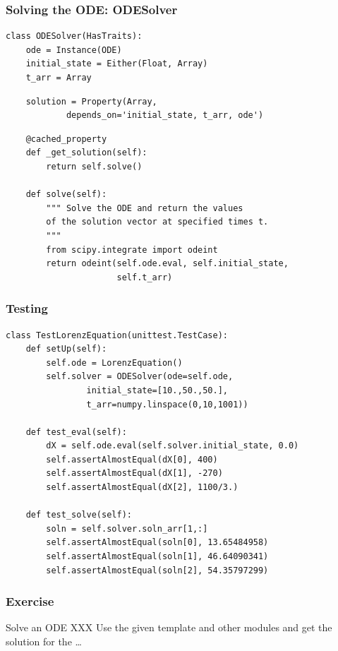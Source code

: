 \documentclass[14pt,compress]{beamer}
\newcounter{time}
\begin{document}
\begin{frame}
\frametitle{Solving the ODE: ODESolver}
\footnotesize
\begin{lstlisting}
class ODESolver(HasTraits):
    ode = Instance(ODE)
    initial_state = Either(Float, Array)
    t_arr = Array
\end{lstlisting}
\pause
\begin{lstlisting}
    solution = Property(Array, 
            depends_on='initial_state, t_arr, ode')
\end{lstlisting}
\pause
\begin{lstlisting}
    @cached_property
    def _get_solution(self):
        return self.solve()

    def solve(self):
        """ Solve the ODE and return the values 
        of the solution vector at specified times t. 
        """
        from scipy.integrate import odeint
        return odeint(self.ode.eval, self.initial_state, 
                      self.t_arr)
\end{lstlisting}
\end{frame}

\begin{frame}
\frametitle{Testing}
\footnotesize
\begin{lstlisting}
class TestLorenzEquation(unittest.TestCase):
    def setUp(self):
        self.ode = LorenzEquation()
        self.solver = ODESolver(ode=self.ode, 
                initial_state=[10.,50.,50.], 
                t_arr=numpy.linspace(0,10,1001))

    def test_eval(self):
        dX = self.ode.eval(self.solver.initial_state, 0.0)
        self.assertAlmostEqual(dX[0], 400)
        self.assertAlmostEqual(dX[1], -270)
        self.assertAlmostEqual(dX[2], 1100/3.)

    def test_solve(self):
        soln = self.solver.soln_arr[1,:]
        self.assertAlmostEqual(soln[0], 13.65484958)
        self.assertAlmostEqual(soln[1], 46.64090341)
        self.assertAlmostEqual(soln[2], 54.35797299)
\end{lstlisting}
\end{frame}

\begin{frame}[plain]
    \frametitle{Exercise}
  \begin{block}{Solve an ODE}
      XXX
      Use the given template and other modules and get the
      solution for the \ldots
  \end{block}  
\end{frame}
\end{document}
